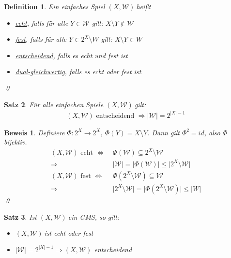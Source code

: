 \documentclass[ngerman]{scrartcl}
\theoremstyle{custom}
\newtheorem{mdef}{Definition} \numberwithin{mdef}{subsection}
\newtheorem{ms}[mdef]{Satz}
\newtheorem*{bw}{Beweis}
\newcommand{\0}{\mathbf{0}}
\newcommand{\1}{\mathbf{L}}
\newcommand{\sg}{$(X,\mathcal{W})~$}
\newcommand{\W}{\mathcal{W}}
\begin{document}
\begin{mdef}
Ein einfaches Spiel \sg hei\ss t 
\begin{itemize}
\item[(1)] \underline{echt}, falls f\"ur alle $Y \in \W$ gilt: $X
  \setminus Y \not \in \W$
\item[(2)] \underline{fest}, falls f\"ur alle $Y \in 2^X \setminus W$ gilt: $X
  \setminus Y \in W$
\item[(3)] \underline{entscheidend}, falls es echt \emph{und}
  fest ist
\item[(4)] \underline{dual-gleichwertig}, falls es echt \emph{oder}
  fest ist
\end{itemize}
\qed
\end{mdef}

\begin{ms}
F\"ur alle einfachen Spiele \sg gilt:
\begin{align*}
(X, \W) \text{ entscheidend } \Rightarrow \vert \W \vert =
2^{\vert X \vert -1}
\end{align*}
\end{ms}

\begin{bw}
Definiere $\Phi: 2^X \rightarrow 2^X, ~\Phi(Y) = X \setminus Y$. Dann
gilt $\Phi^2 = id$, also $\Phi$ bijektiv.
\begin{align*}
(X,\W) \text{ echt } \Leftrightarrow&~ \Phi(\W) \subseteq 2^X \setminus \W\\
\Rightarrow&~ \vert \W \vert = \vert \Phi(\W) \vert \leq \vert 2^X
\setminus \W \vert\\
(X,\W) \text{ fest } \Leftrightarrow&~ \Phi(2^X \setminus \W)
\subseteq \W\\
\Rightarrow&~ \vert 2^X \setminus \W \vert = \vert \Phi(2^X \setminus
\W) \vert
\leq \vert W \vert
\end{align*}
\qed
\end{bw}

\begin{ms}
Ist \sg ein GMS, so gilt:
\begin{itemize}
\item[(1)] \sg ist echt oder fest
\item[(2)] $\vert \W \vert = 2^{\vert X \vert -1} \Rightarrow (X,\W)$
  entscheidend
\end{itemize}
\end{ms}
\end{document}
